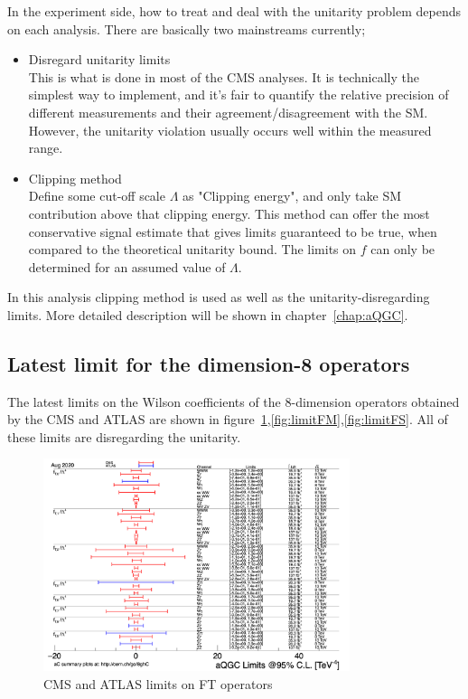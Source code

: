 In the experiment side, how to treat and deal with the unitarity problem depends on each analysis. 
There are basically two mainstreams currently;
\begin{itemize}
    \item Disregard unitarity limits \\
    This is what is done in most of the CMS analyses. It is technically the simplest way to implement, and it's fair to quantify the relative precision of different measurements and their agreement/disagreement with the SM. However, the unitarity violation usually occurs well within the measured range.
    \item Clipping method \\
    Define some cut-off scale $\Lambda$ as "Clipping energy", and only take SM contribution above that clipping energy. This method can offer the most conservative signal estimate that gives limits guaranteed to be true, when compared to the theoretical unitarity bound. 
    The limits on $f$ can only be determined for an assumed value of $\Lambda$.
\end{itemize}
In this analysis clipping method is used as well as the unitarity-disregarding limits. 
More detailed description will be shown in chapter~\ref{chap:aQGC}.

\subsection{Latest limit for the dimension-8 operators}
The latest limits on the Wilson coefficients of the 8-dimension operators obtained by the CMS and ATLAS are shown in figure~\ref{fig:limitFT},\ref{fig:limitFM},\ref{fig:limitFS}. All of these limits are disregarding the unitarity.
\begin{figure}[tbp]
\begin{center}
 \includegraphics[width=0.80\textwidth,keepaspectratio]{figures/aQGC/aQGC_ft.png}
\caption{CMS and ATLAS limits on FT operators}
\label{fig:limitFT}
\end{center}
\end{figure}

